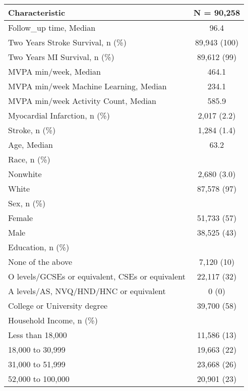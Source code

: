 
\begin{tabular}{lc}
\toprule
\textbf{Characteristic} & \textbf{N = 90,258}\\
\midrule
Follow\_up time, Median & 96.4\\
Two Years Stroke Survival, n (\%) & 89,943 (100)\\
Two Years MI Survival, n (\%) & 89,612 (99)\\
MVPA min/week, Median & 464.1\\
MVPA min/week Machine Learning, Median & 234.1\\
\addlinespace
MVPA min/week Activity Count, Median & 585.9\\
Myocardial Infarction, n (\%) & 2,017 (2.2)\\
Stroke, n (\%) & 1,284 (1.4)\\
Age, Median & 63.2\\
Race, n (\%) & \\
\addlinespace
\hspace{1em}Nonwhite & 2,680 (3.0)\\
\hspace{1em}White & 87,578 (97)\\
Sex, n (\%) & \\
\hspace{1em}Female & 51,733 (57)\\
\hspace{1em}Male & 38,525 (43)\\
\addlinespace
Education, n (\%) & \\
\hspace{1em}None of the above & 7,120 (10)\\
\hspace{1em}O levels/GCSEs or equivalent, CSEs or equivalent & 22,117 (32)\\
\hspace{1em}A levels/AS, NVQ/HND/HNC or equivalent & 0 (0)\\
\hspace{1em}College or University degree & 39,700 (58)\\
\addlinespace
Household Income, n (\%) & \\
\hspace{1em}Less than 18,000 & 11,586 (13)\\
\hspace{1em}18,000 to 30,999 & 19,663 (22)\\
\hspace{1em}31,000 to 51,999 & 23,668 (26)\\
\hspace{1em}52,000 to 100,000 & 20,901 (23)\\

\end{tabular}
